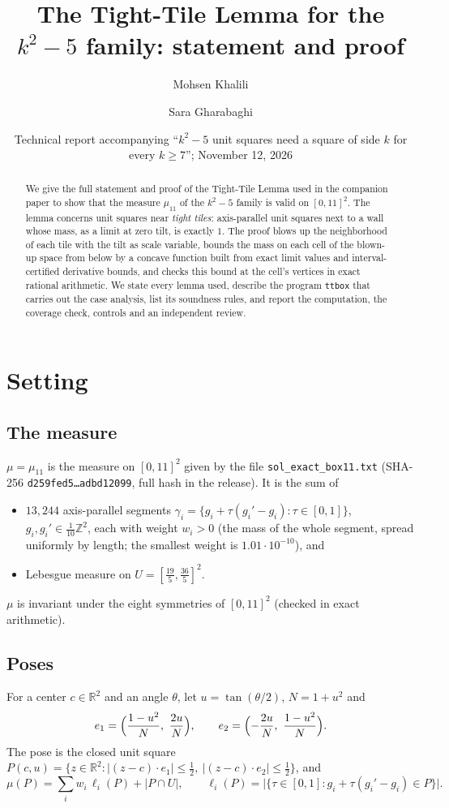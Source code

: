 \documentclass[11pt]{amsart}
\title{The Tight-Tile Lemma for the $k^2-5$ family: statement and proof}
\author{Mohsen Khalili}
\author{Sara Gharabaghi}
\date{Technical report accompanying ``$k^2-5$ unit squares need a square of side $k$ for every $k\ge7$'';
November 12, 2026}
\theoremstyle{definition}
\theoremstyle{remark}
\newcommand{\R}{\mathbb R}
\newcommand{\Z}{\mathbb Z}
\begin{document}
\begin{abstract}
We give the full statement and proof of the Tight-Tile Lemma used in the companion paper to show that the measure
$\mu_{11}$ of the $k^2-5$ family is valid on $[0,11]^2$. The lemma concerns unit squares near \emph{tight tiles}:
axis-parallel unit squares next to a wall whose mass, as a limit at zero tilt, is exactly $1$. The proof blows up
the neighborhood of each tile with the tilt as scale variable, bounds the mass on each cell of the blown-up space
from below by a concave function built from exact limit values and interval-certified derivative bounds, and checks
this bound at the cell's vertices in exact rational arithmetic. We state every lemma used, describe the program
\texttt{ttbox} that carries out the case analysis, list its soundness rules, and report the computation, the
coverage check, controls and an independent review.
\end{abstract}
\maketitle
\tableofcontents

\section{Setting}\label{sec:setting}

\subsection{The measure}
$\mu=\mu_{11}$ is the measure on $[0,11]^2$ given by the file \texttt{sol\_exact\_box11.txt} (SHA-256
\texttt{d259fed5\ldots adbd12099}, full hash in the release). It is the sum of
\begin{itemize}
\item $13{,}244$ axis-parallel segments $\gamma_i=\{g_i+\tau(g_i'-g_i):\tau\in[0,1]\}$, $g_i,g_i'\in\frac1{10}\Z^2$,
each with weight $w_i>0$ (the mass of the whole segment, spread uniformly by length; the smallest weight is
$1.01\cdot10^{-10}$), and
\item Lebesgue measure on $U=[\frac{19}5,\frac{36}5]^2$.
\end{itemize}
$\mu$ is invariant under the eight symmetries of $[0,11]^2$ (checked in exact arithmetic).

\subsection{Poses}
For a center $c\in\R^2$ and an angle $\theta$, let $u=\tan(\theta/2)$, $N=1+u^2$ and
\[
e_1=\Bigl(\frac{1-u^2}N,\ \frac{2u}N\Bigr),\qquad e_2=\Bigl(-\frac{2u}N,\ \frac{1-u^2}N\Bigr).
\]
The pose is the closed unit square $P(c,u)=\{z\in\R^2:|(z-c)\cdot e_1|\le\frac12,\ |(z-c)\cdot e_2|\le\frac12\}$, and
\[
\mu(P)=\sum_i w_i\,\ell_i(P)+|P\cap U|,\qquad \ell_i(P)=\bigl|\{\tau\in[0,1]:g_i+\tau(g_i'-g_i)\in P\}\bigr|.
\]
\end{document}
